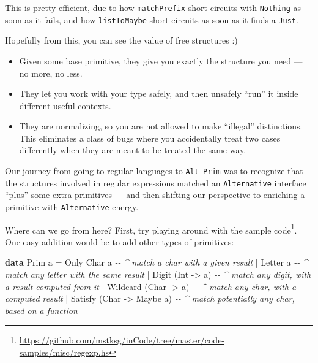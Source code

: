 \documentclass[]{article}
\newenvironment{Shaded}{}{}
\newcommand{\CommentTok}[1]{\textcolor[rgb]{0.38,0.63,0.69}{\textit{#1}}}
\newcommand{\DataTypeTok}[1]{\textcolor[rgb]{0.56,0.13,0.00}{#1}}
\newcommand{\KeywordTok}[1]{\textcolor[rgb]{0.00,0.44,0.13}{\textbf{#1}}}
\newcommand{\NormalTok}[1]{#1}
\newcommand{\OperatorTok}[1]{\textcolor[rgb]{0.40,0.40,0.40}{#1}}
\newcommand{\OtherTok}[1]{\textcolor[rgb]{0.00,0.44,0.13}{#1}}
\renewcommand{\href}[2]{#2\footnote{\url{#1}}}
\begin{document}
This is pretty efficient, due to how \texttt{matchPrefix} short-circuits with
\texttt{Nothing} as soon as it fails, and how \texttt{listToMaybe}
short-circuits as soon as it finds a \texttt{Just}.

Hopefully from this, you can see the value of free structures :)

\begin{itemize}
\tightlist
\item
  Given some base primitive, they give you exactly the structure you need --- no
  more, no less.
\item
  They let you work with your type safely, and then unsafely ``run'' it inside
  different useful contexts.
\item
  They are normalizing, so you are not allowed to make ``illegal'' distinctions.
  This eliminates a class of bugs where you accidentally treat two cases
  differently when they are meant to be treated the same way.
\end{itemize}

Our journey from going to regular languages to \texttt{Alt\ Prim} was to
recognize that the structures involved in regular expressions matched an
\texttt{Alternative} interface ``plus'' some extra primitives --- and then
shifting our perspective to enriching a primitive with \texttt{Alternative}
energy.

Where can we go from here? First, try playing around with the
\href{https://github.com/mstksg/inCode/tree/master/code-samples/misc/regexp.hs}{sample
code}. One easy addition would be to add other types of primitives:

\begin{Shaded}
\begin{Highlighting}[]
\KeywordTok{data} \DataTypeTok{Prim}\NormalTok{ a }\OtherTok{=}
    \DataTypeTok{Only} \DataTypeTok{Char}\NormalTok{ a                 }\CommentTok{{-}{-} \^{} match a char with a given result}
  \OperatorTok{|} \DataTypeTok{Letter}\NormalTok{ a                    }\CommentTok{{-}{-} \^{} match any letter with the same result}
  \OperatorTok{|} \DataTypeTok{Digit}\NormalTok{    (}\DataTypeTok{Int}  \OtherTok{{-}>}\NormalTok{ a)        }\CommentTok{{-}{-} \^{} match any digit, with a result computed from it}
  \OperatorTok{|} \DataTypeTok{Wildcard}\NormalTok{ (}\DataTypeTok{Char} \OtherTok{{-}>}\NormalTok{ a)        }\CommentTok{{-}{-} \^{} match any char, with a computed result}
  \OperatorTok{|} \DataTypeTok{Satisfy}\NormalTok{ (}\DataTypeTok{Char} \OtherTok{{-}>} \DataTypeTok{Maybe}\NormalTok{ a)   }\CommentTok{{-}{-} \^{} match potentially any char, based on a function}
\end{Highlighting}
\end{Shaded}
\end{document}
